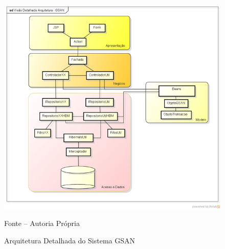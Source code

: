 \begin{figure}[t!]
	\centering
	\includegraphics[width=\paperwidth]{figuras/gsan_arquitetura.png}
	\caption{Arquitetura Detalhada do Sistema GSAN}	
	\label{figura:arquiteturaDetalhada}
	Fonte – Autoria Própria
\end{figure}

